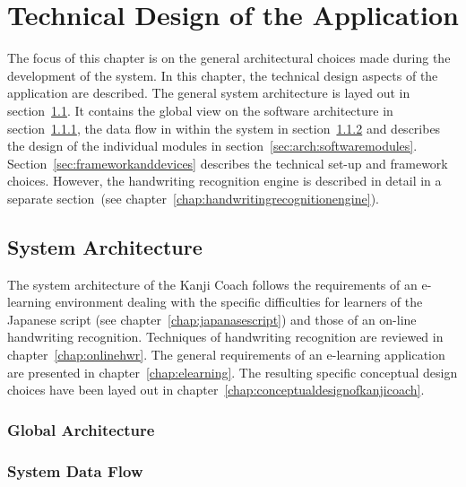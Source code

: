 
\chapter{Technical Design of the Application}
\label{chap:technicaldesign}

The focus of this chapter is on the general architectural choices made during
the development of the system. In this chapter, the technical design aspects 
of the application are described. The general system architecture is layed out in
section~\ref{sec:systemarchitecture}. It contains the global view on the software
architecture in section~\ref{sec:globalarchitecture}, the data flow in within
the system in section~\ref{sec:arch:systemdataflow} and describes the design
of the individual modules in section~\ref{sec:arch:softwaremodules}.
Section~\ref{sec:frameworkanddevices} describes the technical set-up and 
framework choices. However, the handwriting recognition engine is described 
in detail in a separate 
section~(see chapter~\ref{chap:handwritingrecognitionengine}).

\section{System Architecture}
\label{sec:systemarchitecture}

The system architecture of the Kanji Coach follows the requirements of an 
e-learning environment dealing with the specific difficulties for learners 
of the Japanese script (see chapter~\ref{chap:japanasescript}) and those of an 
on-line handwriting recognition. Techniques of handwriting recognition are 
reviewed in chapter~\ref{chap:onlinehwr}. The general requirements of an 
e-learning application are presented in chapter~\ref{chap:elearning}. 
The resulting specific conceptual design choices have been 
layed out in chapter~\ref{chap:conceptualdesignofkanjicoach}.

\subsection{Global Architecture}
\label{sec:globalarchitecture}



\subsection{System Data Flow}
\label{sec:arch:systemdataflow}

